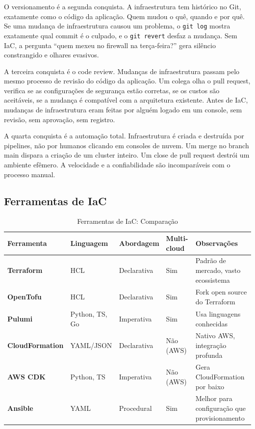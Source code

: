O versionamento é a segunda conquista. A infraestrutura tem histórico no Git,
exatamente como o código da aplicação. Quem mudou o quê, quando e por quê. Se
uma mudança de infraestrutura causou um problema, o \texttt{git log} mostra
exatamente qual commit é o culpado, e o \texttt{git revert} desfaz a mudança.
Sem IaC, a pergunta ``quem mexeu no firewall na terça-feira?'' gera silêncio
constrangido e olhares evasivos.

A terceira conquista é o code review. Mudanças de infraestrutura passam pelo
mesmo processo de revisão do código da aplicação. Um colega olha o pull request,
verifica se as configurações de segurança estão corretas, se os custos são
aceitáveis, se a mudança é compatível com a arquitetura existente. Antes de IaC,
mudanças de infraestrutura eram feitas por alguém logado em um console, sem
revisão, sem aprovação, sem registro.

A quarta conquista é a automação total. Infraestrutura é criada e destruída por
pipelines, não por humanos clicando em consoles de nuvem. Um merge no branch main
dispara a criação de um cluster inteiro. Um close de pull request destrói um
ambiente efêmero. A velocidade e a confiabilidade são incomparáveis com o processo
manual.

\subsection{Ferramentas de IaC}

\begin{table}[h]
\centering
\caption{Ferramentas de IaC: Comparação}
\begin{tabular}{>{\bfseries}p{2.5cm} p{2cm} p{2.5cm} p{2cm} p{3cm}}
\toprule
Ferramenta & Linguagem & Abordagem & Multi-cloud & Observações \\
\midrule
Terraform & HCL & Declarativa & Sim & Padrão de mercado, vasto ecossistema \\
\addlinespace
OpenTofu & HCL & Declarativa & Sim & Fork open source do Terraform \\
\addlinespace
Pulumi & Python, TS, Go & Imperativa & Sim & Usa linguagens conhecidas \\
\addlinespace
CloudFormation & YAML/JSON & Declarativa & Não (AWS) & Nativo AWS, integração profunda \\
\addlinespace
AWS CDK & Python, TS & Imperativa & Não (AWS) & Gera CloudFormation por baixo \\
\addlinespace
Ansible & YAML & Procedural & Sim & Melhor para configuração que provisionamento \\
\bottomrule
\end{tabular}
\end{table}

